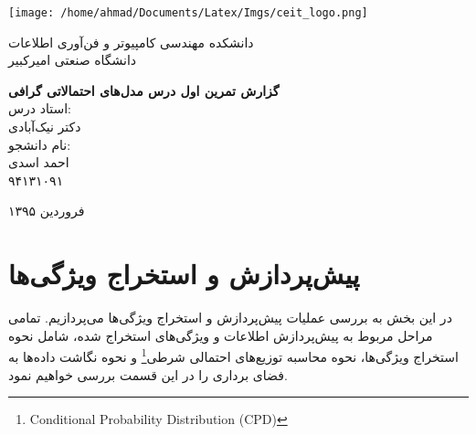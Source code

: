 \documentclass[11.5pt,a4paper]{article}
\newcommand{\nocontentsline}[3]{}
\newcommand{\tocless}[2]{\bgroup\let\addcontentsline=\nocontentsline#1{#2}\egroup}
\begin{document}
\thispagestyle{empty}
\vspace*{-28mm}
\centerline{\texttt{[image: /home/ahmad/Documents/Latex/Imgs/ceit\_logo.png]}}

\begin{center}
\vspace{-2mm}
{\LARGE
{
دانشکده مهندسی کامپیوتر و فن‌آوری اطلاعات\\	
دانشگاه صنعتی امیرکبیر	
}
\\[2.1cm]
}

{\large
\textbf{گزارش تمرین اول درس مدل‌های احتمالاتی گرافی}
\\[2cm]

استاد درس:
\\[.5cm]
{\Large
دکتر نیک‌آبادی}
\\[1.5cm]
\large 
نام دانشجو:
\\[.5cm]
{\Large
احمد اسدی}
\\[.5cm]
۹۴۱۳۱۰۹۱
\\[1.5cm]
}

{\large
فروردین ۱۳۹۵
}
\end{center}

\newpage
\baselineskip=1cm
\tocless\tableofcontents

\newpage
\baselineskip=0.75cm
\section{پیش‌پردازش و استخراج ویژگی‌ها}
در این بخش به بررسی عملیات پیش‌پردازش و استخراج ویژگی‌ها ‌می‌پردازیم. تمامی مراحل مربوط به پیش‌پردازش اطلاعات و ویژگی‌های استخراج شده، شامل نحوه استخراج ویژگی‌ها، نحوه محاسبه توزیع‌های احتمالی شرطی\footnote{Conditional Probability Distribution (CPD)} و نحوه نگاشت داده‌ها به فضای برداری را در این قسمت بررسی خواهیم نمود.
\end{document}

